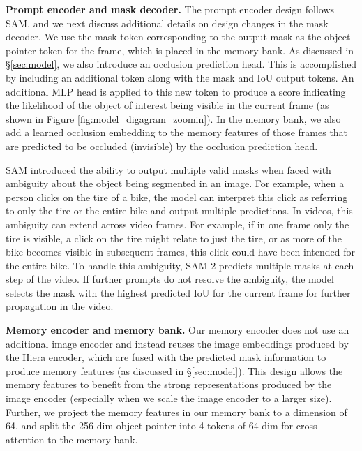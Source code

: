 \documentclass[]{fairmeta}
\renewcommand{\paragraph}[1]{\vspace{1.25mm}\noindent\textbf{#1}}
\newcommand{\secref}[1]{\S\ref{#1}}
\renewcommand{\paragraph}[1]{\vspace{1.25mm}\noindent\textbf{#1}}
\begin{document}
\paragraph{Prompt encoder and mask decoder.} The prompt encoder design follows SAM, and we next discuss additional details on design changes in the mask decoder. We use the mask token corresponding to the output mask as the object pointer token for the frame, which is placed in the memory bank. As discussed in \secref{sec:model}, we also introduce an occlusion prediction head. This is accomplished by including an additional token along with the mask and IoU output tokens. An additional MLP head is applied to this new token to produce a score indicating the likelihood of the object of interest being visible in the current frame (as shown in Figure \ref{fig:model_digagram_zoomin}). In the memory bank, we also add a learned occlusion embedding to the memory features of those frames that are predicted to be occluded (invisible) by the occlusion prediction head.

SAM introduced the ability to output multiple valid masks when faced with ambiguity about the object being segmented in an image. For example, when a person clicks on the tire of a bike, the model can interpret this click as referring to only the tire or the entire bike and output multiple predictions. In videos, this ambiguity can extend across video frames. For example, if in one frame only the tire is visible, a click on the tire might relate to just the tire, or as more of the bike becomes visible in subsequent frames, this click could have been intended for the entire bike. To handle this ambiguity, SAM 2 predicts multiple masks at each step of the video. If further prompts do not resolve the ambiguity, the model selects the mask with the highest predicted IoU for the current frame for further propagation in the video.

\paragraph{Memory encoder and memory bank.} %
Our memory encoder does not use an additional image encoder and instead reuses the image embeddings produced by the Hiera encoder, which are fused with the predicted mask information to produce memory features (as discussed in \secref{sec:model}). This design allows the memory features to benefit from the strong representations produced by the image encoder (especially when we scale the image encoder to a larger size). Further, we project the memory features in our memory bank to a dimension of 64, and split the 256-dim object pointer into 4 tokens of 64-dim for cross-attention to the memory bank.
\end{document}
